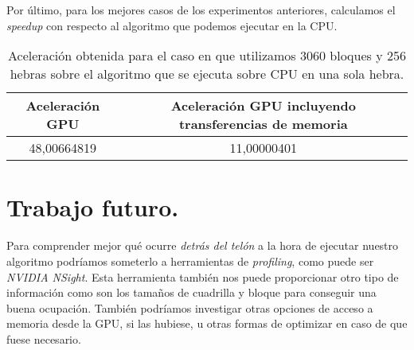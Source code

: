 Por último, para los mejores casos de los experimentos anteriores, calculamos el \textit{speedup} con respecto al algoritmo
que podemos ejecutar en la CPU.

\begin{table}[H]
    \centering
    \begin{tabular}{|c|c|}
    \hline
    \textbf{Aceleración GPU} & \textbf{Aceleración GPU incluyendo transferencias de memoria} \\ \hline
    48,00664819     & 11,00000401                    \\ \hline
    \end{tabular}
    \caption{Aceleración obtenida para el caso en que utilizamos 3060 bloques y 256 hebras sobre el algoritmo
    que se ejecuta sobre CPU en una sola hebra.}
\end{table}

\section{Trabajo futuro.}

Para comprender mejor qué ocurre \textit{detrás del telón} a la hora de ejecutar nuestro algoritmo podríamos
someterlo a herramientas de \textit{profiling}, como puede ser \textit{NVIDIA NSight}. Esta herramienta también
nos puede proporcionar otro tipo de información como son los tamaños de cuadrilla y bloque para conseguir
una buena ocupación. También podríamos investigar otras opciones de acceso a memoria desde la GPU, si las hubiese,
u otras formas de optimizar en caso de que fuese necesario.
